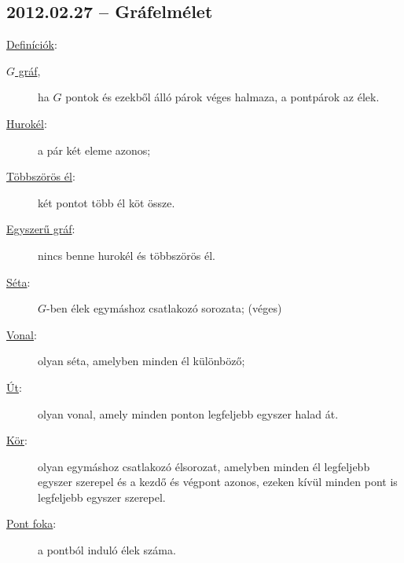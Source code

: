 \documentclass{article}
\begin{document}
\subsection*{2012.02.27 -- Gráfelmélet }
\underline{Definíciók}:

\begin{description}
\item[\underline{$G$ gráf},] ha $G$ pontok és ezekből álló párok véges halmaza, a pontpárok az élek.

\item[\underline{Hurokél}:] a pár két eleme azonos;

\item[\underline{Többszörös él}:]
két pontot több él köt össze.

\item[\underline{Egyszerű gráf}:] nincs benne hurokél és többszörös él.

\item[\underline{Séta}:] $G$-ben élek egymáshoz csatlakozó sorozata; (véges)

\item[\underline{Vonal}:] olyan séta, amelyben minden él különböző;

\item[\underline{Út}:] olyan vonal, amely minden ponton legfeljebb egyszer halad át.

\item[\underline{Kör}:] olyan egymáshoz csatlakozó élsorozat, amelyben minden él legfeljebb egyszer szerepel és a kezdő és végpont azonos, ezeken kívül minden pont is legfeljebb egyszer szerepel.

\item[\underline{Pont foka}:] a pontból induló élek száma.

\end{description}
\end{document}
